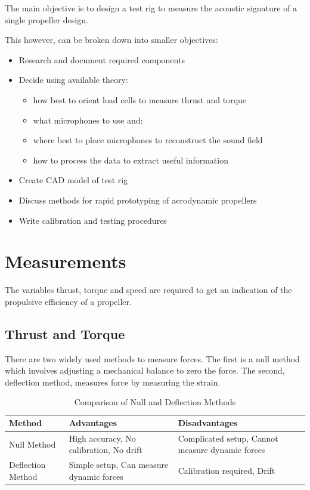 \documentclass{article}
\begin{document}
The main objective is to design a test rig to measure the acoustic signature of a single propeller design.

This however, can be broken down into smaller objectives:

\begin{itemize}
    \item Research and document required components
    \item Decide using available theory:
    \begin{itemize}
        \item how best to orient load cells to measure thrust and torque
        \item what microphones to use and:
        \item where best to place microphones to reconstruct the sound field
        \item how to process the data to extract useful information
    \end{itemize}
    \item Create CAD model of test rig
    \item Discuss methods for rapid prototyping of aerodynamic propellers
    \item Write calibration and testing procedures
\end{itemize}

\section{Measurements}

The variables thrust, torque and speed are required to get an indication of the propulsive efficiency of a propeller.

\subsection{Thrust and Torque}

There are two widely used methods to measure forces.
The first is a null method which involves adjusting a mechanical balance to zero the force.
The second, deflection method, measures force by measuring the strain.

\begin{table}[h!]
    \centering
    \begin{tabular}{|l|l|l|}
        \hline
        \textbf{Method} & \textbf{Advantages} & \textbf{Disadvantages} \\
        \hline
        Null Method & High accuracy, No calibration, No drift & Complicated setup, Cannot measure dynamic forces \\
        \hline
        Deflection Method & Simple setup, Can measure dynamic forces & Calibration required, Drift \\
        \hline
    \end{tabular}
    \caption{Comparison of Null and Deflection Methods}
\end{table}
\end{document}
